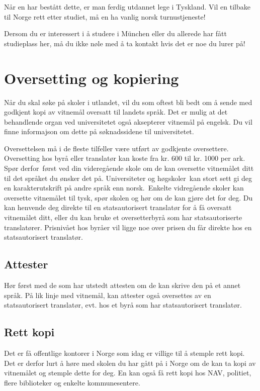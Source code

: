 Når en har bestått dette, er man ferdig utdannet lege i Tyskland. Vil en tilbake til Norge rett etter studiet, må en ha vanlig norsk turnustjeneste!

Dersom du er interessert i å studere i München eller du allerede har fått studieplass her, må du ikke nøle med å ta kontakt hvis det er noe du lurer på!


\section{Oversetting og kopiering}

Når du skal søke på skoler i utlandet, vil du som oftest bli bedt om å sende med godkjent kopi av vitnemål oversatt til landets språk. Det er mulig at det behandlende organ ved universitetet også aksepterer vitnemål på engelsk. Du vil finne informajson om dette på søknadssidene til universitetet.

Oversettelsen må i de fleste tilfeller være utført av godkjente oversettere.  Oversetting hos byrå eller translatør kan koste fra kr. 600 til kr. 1000 per ark. Spør derfor først ved din videregående skole om de kan oversette vitnemålet ditt til det språket du ønsker det på. Universiteter og høgskoler kan stort sett gi deg en karakterutskrift på andre språk enn norsk. Enkelte vidregående skoler kan oversette vitnemålet til tysk, spør skolen og hør om de kan gjøre det for deg.
Du kan henvende deg direkte til en statsautorisert translatør for å få oversatt vitnemålet ditt, eller du kan bruke et oversetterbyrå som har statsautoriserte translatører. Prisnivået hos byråer vil ligge noe over prisen du får direkte hos en statsautorisert translatør. 


\subsection{Attester}
Hør først med de som har utstedt attesten om de kan skrive den på et annet språk. På lik linje med vitnemål, kan attester også oversettes av en statsautorisert translatør, evt. hos et byrå som har statsautorisert translatør.

\subsection{Rett kopi}
Det er få offentlige kontorer i Norge som idag er villige til å stemple rett kopi. Det er derfor lurt å høre med skolen du har gått på i Norge om de kan ta kopi av vitnemålet og stemple dette for deg. En kan også få rett kopi hos NAV, politiet, flere biblioteker og enkelte kommunesentere.



